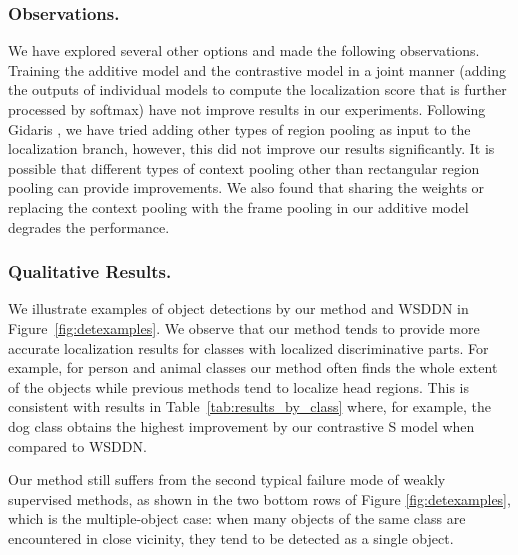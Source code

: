 \documentclass[runningheads]{llncs}
\begin{document}
\subsubsection{Observations.}

We have explored several other options and made the following observations.
Training the additive model and the contrastive model in a joint manner (adding the outputs of individual models to compute the localization score that is further processed by softmax) have not improve results in our experiments.
Following Gidaris \etal\cite{Gidaris_2015_ICCV}, we have tried adding other types of region pooling as input to the localization branch, however, this did not improve our results significantly. It is possible that different types of context pooling other than rectangular region pooling can provide improvements. We also found that sharing the weights or replacing the context pooling with the frame pooling in our additive model degrades the performance.








\subsubsection{Qualitative Results.} 
We illustrate examples of object detections by our method and WSDDN in Figure~\ref{fig:detexamples}.
We observe that our method tends to provide more accurate localization results for 
classes with localized discriminative parts. For example, for person and animal classes our method often finds
the whole extent of the objects while previous methods tend to localize head regions.
This is consistent with results in Table~\ref{tab:results_by_class} where, for example, the dog class obtains the highest improvement by our contrastive S model when compared to WSDDN. 


Our method still suffers from the second typical failure mode of weakly supervised 
methods, as shown in the two bottom rows of Figure \ref{fig:detexamples}, which is the 
multiple-object case: when many objects of the same class are encountered in close 
vicinity, they tend to be detected as a single object.
\end{document}
